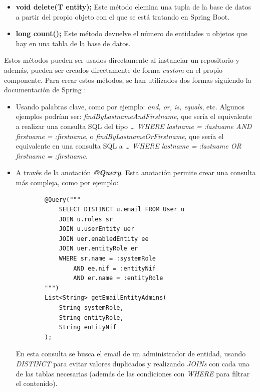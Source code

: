 \begin{itemize}
\begin{itemize}
        \item \textbf{void delete(T entity);}
        Este método elemina una tupla de la base de datos a partir del propio objeto con el que se está tratando en Spring Boot.

        \item \textbf{long count();}
        Este método devuelve el número de entidades u objetos que hay en una tabla de la base de datos.
    \end{itemize}

    Estos métodos pueden ser usados directamente al instanciar un repositorio y además, pueden ser creados directamente de forma
    \textit{custom} en el propio componente. Para crear estos métodos, se han utilizados dos formas siguiendo la documentación de
    Spring \cite{jdbc}:

    \begin{itemize}
        \item Usando palabras clave, como por ejemplo: \textit{and, or, is, equals}, etc. Algunos ejemplos podrían ser: 
        \textit{findByLastnameAndFirstname}, que sería el equivalente a realizar una consulta SQL del tipo \textit{… WHERE lastname 
        = :lastname AND firstname = :firstname}, o \textit{findByLastnameOrFirstname}, que sería el equivalente en una consulta SQL
        a \textit{… WHERE lastname = :lastname OR firstname = :firstname}.

        \item A través de la anotación \textbf{\textit{@Query}}. Esta anotación permite crear una consulta más compleja, como por
        ejemplo:

        \begin{verbatim}
        @Query("""
            SELECT DISTINCT u.email FROM User u
            JOIN u.roles sr
            JOIN u.userEntity uer
            JOIN uer.enabledEntity ee
            JOIN uer.entityRole er
            WHERE sr.name = :systemRole
                AND ee.nif = :entityNif
                AND er.name = :entityRole
        """)
        List<String> getEmailEntityAdmins(
            String systemRole, 
            String entityRole, 
            String entityNif
        );
        \end{verbatim}

        En esta consulta se busca el email de un administrador de entidad, usando \textit{DISTINCT} para evitar valores duplicados y 
        realizando \textit{JOINs} con cada una de las tablas necesarias (además de las condiciones con \textit{WHERE} para filtrar 
        el contenido).
    \end{itemize}


\end{itemize}
